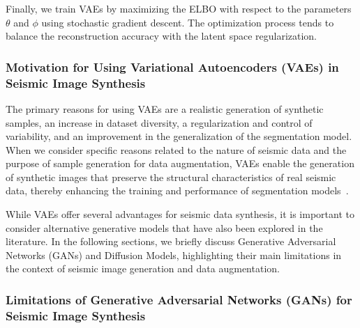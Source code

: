 ﻿\documentclass{ieeeaccess}
\begin{document}
Finally, we train VAEs by maximizing the ELBO with respect to the parameters $\theta$ and $\phi$ using stochastic gradient descent. The optimization process tends to balance the reconstruction accuracy with the latent space regularization.


\subsubsection{Motivation for Using Variational Autoencoders (VAEs) in Seismic Image Synthesis}

The primary reasons for using VAEs are a realistic generation of synthetic samples, an increase in dataset diversity, a regularization and control of variability, and an improvement in the generalization of the segmentation model. When we consider specific reasons related to the nature of seismic data and the purpose of sample generation for data augmentation, VAEs enable the generation of synthetic images that preserve the structural characteristics of real seismic data, thereby enhancing the training and performance of segmentation models~\cite{Henriques2021,Wang2021,Anjom2024}.

While VAEs offer several advantages for seismic data synthesis, it is important to consider alternative generative models that have also been explored in the literature. In the following sections, we briefly discuss Generative Adversarial Networks (GANs) and Diffusion Models, highlighting their main limitations in the context of seismic image generation and data augmentation.

\subsubsection{Limitations of Generative Adversarial Networks (GANs) for Seismic Image Synthesis}
\end{document}
